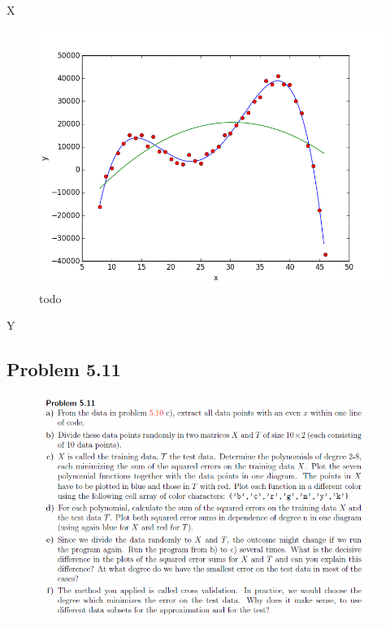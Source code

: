 X


\begin{figure}[!ht]
\includegraphics[width=1\textwidth]{chapters/images/figure-5-10-d}
\caption{todo}
\end{figure}

Y









\subsection{Problem 5.11}


\begin{figure}[!ht]
\includegraphics[width=1\textwidth]{chapters/images/desc-5-11}
\end{figure}


